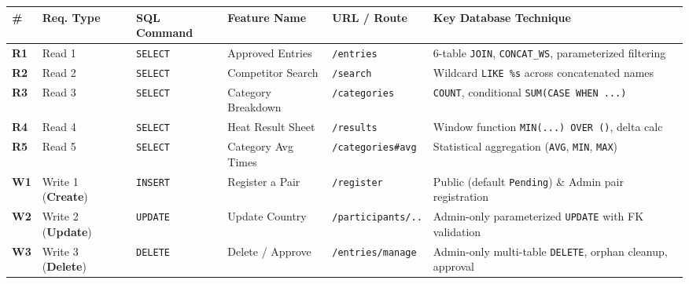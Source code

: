 \documentclass[11pt,a4paper]{article}
\begin{document}
\begin{table}[h!]
\centering
\footnotesize
\begin{tabularx}{\textwidth}{@{}l l l l l X@{}}
\toprule
\textbf{\#} & \textbf{Req. Type} & \textbf{SQL Command} & \textbf{Feature Name} & \textbf{URL / Route} & \textbf{Key Database Technique} \\ \midrule
\textbf{R1} & Read 1 & \texttt{SELECT} & Approved Entries & \texttt{/entries} & 6-table \texttt{JOIN}, \texttt{CONCAT\_WS}, parameterized filtering \\
\textbf{R2} & Read 2 & \texttt{SELECT} & Competitor Search & \texttt{/search} & Wildcard \texttt{LIKE \%s} across concatenated names \\
\textbf{R3} & Read 3 & \texttt{SELECT} & Category Breakdown & \texttt{/categories} & \texttt{COUNT}, conditional \texttt{SUM(CASE WHEN ...)} \\
\textbf{R4} & Read 4 & \texttt{SELECT} & Heat Result Sheet & \texttt{/results} & Window function \texttt{MIN(...) OVER ()}, delta calc \\
\textbf{R5} & Read 5 & \texttt{SELECT} & Category Avg Times & \texttt{/categories\#avg} & Statistical aggregation (\texttt{AVG}, \texttt{MIN}, \texttt{MAX}) \\
\midrule
\textbf{W1} & Write 1 (\textbf{Create}) & \texttt{INSERT} & Register a Pair & \texttt{/register} & Public (default \texttt{Pending}) \& Admin pair registration \\
\textbf{W2} & Write 2 (\textbf{Update}) & \texttt{UPDATE} & Update Country & \texttt{/participants/..} & Admin-only parameterized \texttt{UPDATE} with FK validation \\
\textbf{W3} & Write 3 (\textbf{Delete}) & \texttt{DELETE} & Delete / Approve & \texttt{/entries/manage} & Admin-only multi-table \texttt{DELETE}, orphan cleanup, approval \\ \bottomrule
\end{tabularx}
\end{table}

\vspace{0.2em}
\end{document}
